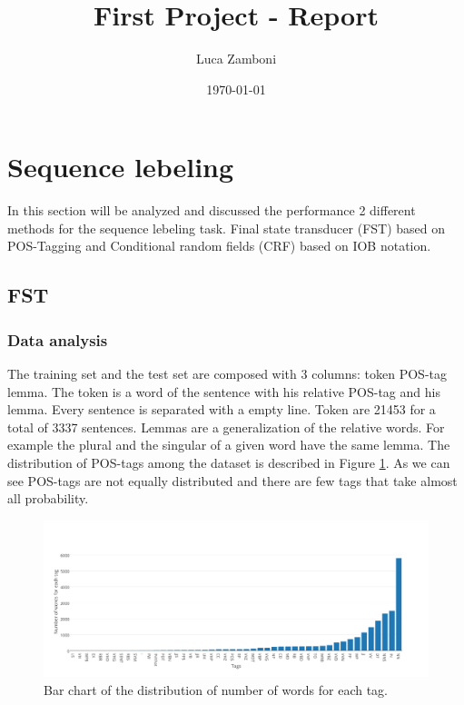 \documentclass[a4paper,8pt,oneside]{article}
\author{Luca Zamboni}
\title{\vspace{-4em} \LARGE First Project - Report}
\date{\today}
\begin{document}




\tableofcontents
\newpage
\section{Sequence lebeling}

	In this section will be analyzed and discussed the performance 2 different methods for the sequence lebeling task. Final state transducer (FST) based on POS-Tagging and Conditional random fields (CRF) based on IOB notation.

	\subsection{FST}
		\subsubsection{Data analysis}
			The training set and the test set are composed with 3 columns: token POS-tag lemma.
			The token is a word of the sentence with his relative POS-tag and his lemma. Every sentence is separated with a empty line. Token are 21453 for a total of 3337 sentences. Lemmas are a generalization of the relative words. For example the plural and the singular of a given word have the same lemma. The distribution of POS-tags among the dataset is described in Figure \ref{tag-dist}. As we can see POS-tags are not equally distributed and there are few tags that take almost all probability.
			\begin{figure}[h!]
			  \centering
			    \includegraphics[width=1.0\textwidth]{img/barcharttag}
			  \caption{Bar chart of the distribution of number of words for each tag.}
			  \label{tag-dist}
			\end{figure}
\end{document}
